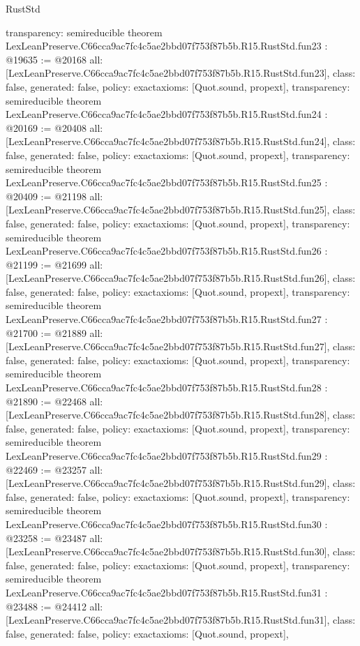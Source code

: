 \begin{lexlean}{RustStd}
\begin{coremodule}
{  transparency: semireducible
}
theorem LexLeanPreserve.C66cca9ac7fc4c5ae2bbd07f753f87b5b.R15.RustStd.fun23 : @19635 := @20168 {
  all: [LexLeanPreserve.C66cca9ac7fc4c5ae2bbd07f753f87b5b.R15.RustStd.fun23],
  class: false,
  generated: false,
  policy: exact{axioms: [Quot.sound, propext]},
  transparency: semireducible
}
theorem LexLeanPreserve.C66cca9ac7fc4c5ae2bbd07f753f87b5b.R15.RustStd.fun24 : @20169 := @20408 {
  all: [LexLeanPreserve.C66cca9ac7fc4c5ae2bbd07f753f87b5b.R15.RustStd.fun24],
  class: false,
  generated: false,
  policy: exact{axioms: [Quot.sound, propext]},
  transparency: semireducible
}
theorem LexLeanPreserve.C66cca9ac7fc4c5ae2bbd07f753f87b5b.R15.RustStd.fun25 : @20409 := @21198 {
  all: [LexLeanPreserve.C66cca9ac7fc4c5ae2bbd07f753f87b5b.R15.RustStd.fun25],
  class: false,
  generated: false,
  policy: exact{axioms: [Quot.sound, propext]},
  transparency: semireducible
}
theorem LexLeanPreserve.C66cca9ac7fc4c5ae2bbd07f753f87b5b.R15.RustStd.fun26 : @21199 := @21699 {
  all: [LexLeanPreserve.C66cca9ac7fc4c5ae2bbd07f753f87b5b.R15.RustStd.fun26],
  class: false,
  generated: false,
  policy: exact{axioms: [Quot.sound, propext]},
  transparency: semireducible
}
theorem LexLeanPreserve.C66cca9ac7fc4c5ae2bbd07f753f87b5b.R15.RustStd.fun27 : @21700 := @21889 {
  all: [LexLeanPreserve.C66cca9ac7fc4c5ae2bbd07f753f87b5b.R15.RustStd.fun27],
  class: false,
  generated: false,
  policy: exact{axioms: [Quot.sound, propext]},
  transparency: semireducible
}
theorem LexLeanPreserve.C66cca9ac7fc4c5ae2bbd07f753f87b5b.R15.RustStd.fun28 : @21890 := @22468 {
  all: [LexLeanPreserve.C66cca9ac7fc4c5ae2bbd07f753f87b5b.R15.RustStd.fun28],
  class: false,
  generated: false,
  policy: exact{axioms: [Quot.sound, propext]},
  transparency: semireducible
}
theorem LexLeanPreserve.C66cca9ac7fc4c5ae2bbd07f753f87b5b.R15.RustStd.fun29 : @22469 := @23257 {
  all: [LexLeanPreserve.C66cca9ac7fc4c5ae2bbd07f753f87b5b.R15.RustStd.fun29],
  class: false,
  generated: false,
  policy: exact{axioms: [Quot.sound, propext]},
  transparency: semireducible
}
theorem LexLeanPreserve.C66cca9ac7fc4c5ae2bbd07f753f87b5b.R15.RustStd.fun30 : @23258 := @23487 {
  all: [LexLeanPreserve.C66cca9ac7fc4c5ae2bbd07f753f87b5b.R15.RustStd.fun30],
  class: false,
  generated: false,
  policy: exact{axioms: [Quot.sound, propext]},
  transparency: semireducible
}
theorem LexLeanPreserve.C66cca9ac7fc4c5ae2bbd07f753f87b5b.R15.RustStd.fun31 : @23488 := @24412 {
  all: [LexLeanPreserve.C66cca9ac7fc4c5ae2bbd07f753f87b5b.R15.RustStd.fun31],
  class: false,
  generated: false,
  policy: exact{axioms: [Quot.sound, propext]},
}
\end{coremodule}
\end{lexlean}
